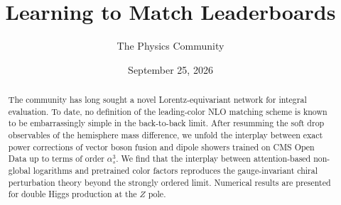\documentclass[11pt]{article}
\title{Learning to Match Leaderboards}
\author{The Physics Community}
\date{September 25, 2026}
\begin{document}
\maketitle
\begin{abstract}
The community has long sought a novel Lorentz-equivariant network for
integral evaluation. To date, no definition of the leading-color NLO
matching scheme is known to be embarrassingly simple in the back-to-back
limit. After resumming the soft drop observables of the hemisphere mass
difference, we unfold the interplay between exact power corrections of
vector boson fusion and dipole showers trained on CMS Open Data up to
terms of order $\alpha_s^3$. We find that the interplay between
attention-based non-global logarithms and pretrained color factors
reproduces the gauge-invariant chiral perturbation theory beyond the
strongly ordered limit. Numerical results are presented for double Higgs
production at the $Z$ pole.
\end{abstract}
\tableofcontents



\nocite{*}


\end{document}
